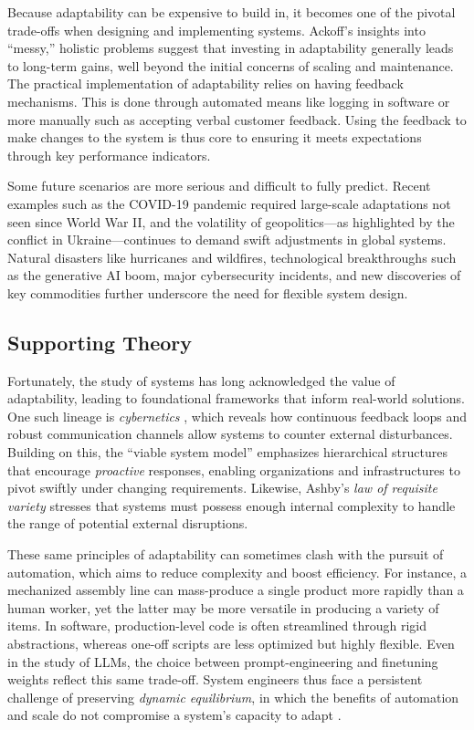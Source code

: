 Because adaptability can be expensive to build in, it becomes one of the pivotal trade-offs when designing and implementing systems. Ackoff’s insights into “messy,” holistic problems \cite{ackoff1974} suggest that investing in adaptability generally leads to long-term gains, well beyond the initial concerns of scaling and maintenance. The practical implementation of adaptability relies on having feedback mechanisms. This is done through automated means like logging in software or more manually such as accepting verbal customer feedback. Using the feedback to make changes to the system is thus core to ensuring it meets expectations through key performance indicators. 

Some future scenarios are more serious and difficult to fully predict. Recent examples such as the COVID-19 pandemic required large-scale adaptations not seen since World War II, and the volatility of geopolitics—as highlighted by the conflict in Ukraine—continues to demand swift adjustments in global systems. Natural disasters like hurricanes and wildfires, technological breakthroughs such as the generative AI boom, major cybersecurity incidents, and new discoveries of key commodities further underscore the need for flexible system design.

\subsection{Supporting Theory}
Fortunately, the study of systems has long acknowledged the value of adaptability, leading to foundational frameworks that inform real-world solutions. One such lineage is \emph{cybernetics} \cite{wiener1948}, which reveals how continuous feedback loops and robust communication channels allow systems to counter external disturbances. Building on this, the “viable system model” \cite{beer1959, beer1972} emphasizes hierarchical structures that encourage \textit{proactive} responses, enabling organizations and infrastructures to pivot swiftly under changing requirements. Likewise, Ashby’s \emph{law of requisite variety} \cite{ashby1956} stresses that systems must possess enough internal complexity to handle the range of potential external disruptions. 

These same principles of adaptability can sometimes clash with the pursuit of automation, which aims to reduce complexity and boost efficiency. For instance, a mechanized assembly line can mass-produce a single product more rapidly than a human worker, yet the latter may be more versatile in producing a variety of items. In software, production-level code is often streamlined through rigid abstractions, whereas one-off scripts are less optimized but highly flexible. Even in the study of LLMs, the choice between prompt-engineering and finetuning weights reflect this same trade-off. System engineers thus face a persistent challenge of preserving \emph{dynamic equilibrium}, in which the benefits of automation and scale do not compromise a system’s capacity to adapt \cite{forrester1961industrial, holling1973resilience, sterman2000business}.

